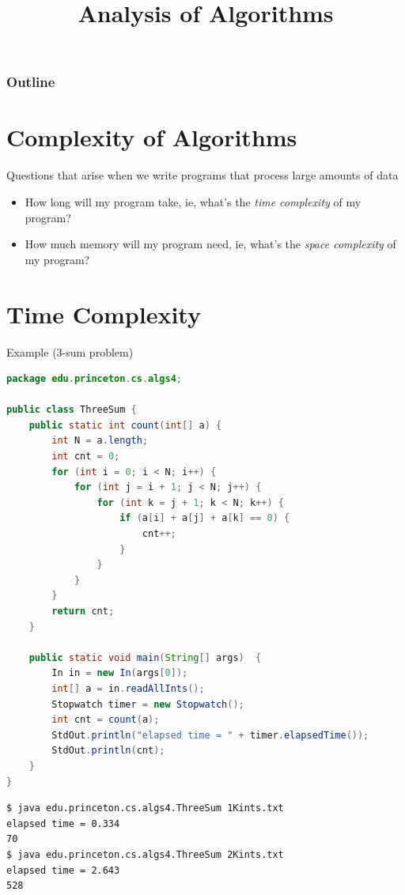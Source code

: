 \documentclass[8pt,a4paper,compress]{beamer}
\title{Analysis of Algorithms}
\date{}
\begin{document}
\begin{frame}
\vfill
\titlepage
\end{frame}

\begin{frame}
\frametitle{Outline}
\tableofcontents
\end{frame}

\section{Complexity of Algorithms}
\begin{frame}[fragile]
Questions that arise when we write programs that process large amounts of data
\begin{itemize}
\item How long will my program take, ie, what's the \emph{time complexity} of my program?
\item How much memory will my program need, ie, what's the \emph{space complexity} of my program?
\end{itemize}
\end{frame}

\section{Time Complexity}
\begin{frame}[fragile]
Example (3-sum problem)
\begin{lstlisting}[language=Java]
package edu.princeton.cs.algs4;

public class ThreeSum {
    public static int count(int[] a) {
        int N = a.length;
        int cnt = 0;
        for (int i = 0; i < N; i++) {
            for (int j = i + 1; j < N; j++) {
                for (int k = j + 1; k < N; k++) {
                    if (a[i] + a[j] + a[k] == 0) { 
                        cnt++; 
                    }
                }
            }
        }
        return cnt;
    }
    
    public static void main(String[] args)  { 
        In in = new In(args[0]);
        int[] a = in.readAllInts();
        Stopwatch timer = new Stopwatch();
        int cnt = count(a);
        StdOut.println("elapsed time = " + timer.elapsedTime());
        StdOut.println(cnt);
    } 
}
\end{lstlisting}

\begin{lstlisting}[language={}]
$ java edu.princeton.cs.algs4.ThreeSum 1Kints.txt 
elapsed time = 0.334
70
$ java edu.princeton.cs.algs4.ThreeSum 2Kints.txt 
elapsed time = 2.643
528
\end{lstlisting}
\end{frame}
\end{document}
